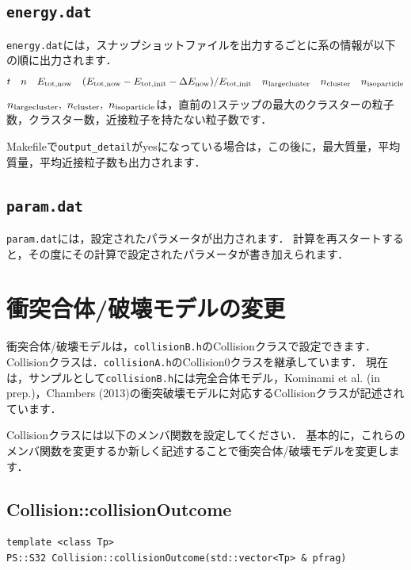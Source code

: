 \documentclass[12pt,a4paper,dvipdfmx]{jsarticle}
\begin{document}

\subsection{\texttt{energy.dat}\label{outputene}}

\texttt{energy.dat}には，スナップショットファイルを出力するごとに系の情報が以下の順に出力されます．
\[
t\quad n\quad E_{\rm tot,now}\quad (E_{\rm tot, now}-E_{\rm tot, init}-\Delta E_{\rm now})/E_{\rm tot, init}\quad n_{\rm large cluater}\quad n_{\rm cluster}\quad n_{\rm iso particle}
\]
$n_{\rm large cluster},\ n_{\rm cluster},\ n_{\rm iso particle}$は，直前の1ステップの最大のクラスターの粒子数，クラスター数，近接粒子を持たない粒子数です．

Makefileで\texttt{output\_detail}がyesになっている場合は，この後に，最大質量，平均質量，平均近接粒子数も出力されます．

\subsection{\texttt{param.dat}}

\texttt{param.dat}には，設定されたパラメータが出力されます．
計算を再スタートすると，その度にその計算で設定されたパラメータが書き加えられます．


\section{衝突合体/破壊モデルの変更\label{collision}}

衝突合体/破壊モデルは，\texttt{collisionB.h}のCollisionクラスで設定できます．
Collisionクラスは．\texttt{collisionA.h}のCollision0クラスを継承しています．
現在は，サンプルとして\texttt{collisionB.h}には完全合体モデル，Kominami et al. (in prep.)，Chambers (2013)の衝突破壊モデルに対応するCollisionクラスが記述されています．

Collisionクラスには以下のメンバ関数を設定してください．
基本的に，これらのメンバ関数を変更するか新しく記述することで衝突合体/破壊モデルを変更します．
\subsection{Collision::collisionOutcome}

\begin{screen}
\begin{verbatim}
template <class Tp>
PS::S32 Collision::collisionOutcome(std::vector<Tp> & pfrag)
\end{verbatim}
\end{screen}
\end{document}
